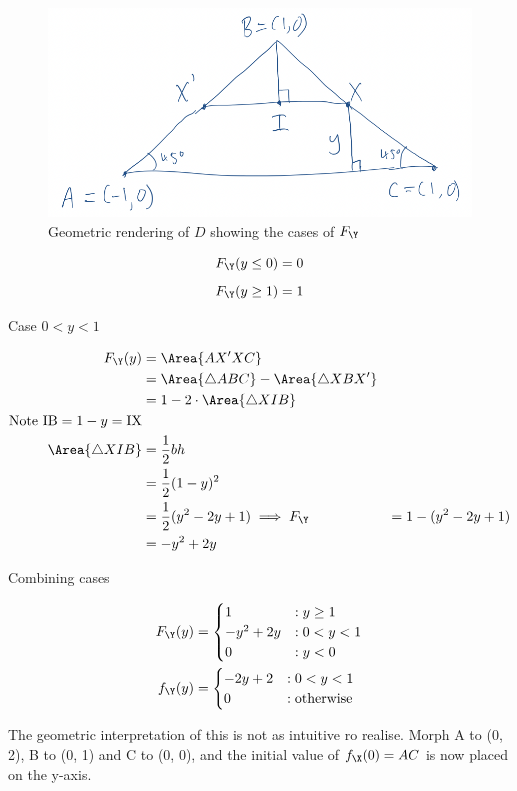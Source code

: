 \begin{figure}[ht]
	\includegraphics[width=1 \textwidth]{Q2c Y diagram.png}
	\caption{Geometric rendering of $D$ showing the cases of $F_\Y$}
	\label{fig:q2c-y}
\end{figure}

\[
F_\Y(y \leq 0) = 0
\]
\[
F_\Y(y \geq 1) = 1
\]

Case $0 < y < 1$

\begin{align*}
F_\Y(y) &= \Area{AX'XC} \\
&= \Area{\triangle ABC} - \Area{\triangle XBX'} \\
&= 1 - 2 \cdot \Area{\triangle XIB} \\
\text{Note } \mathrm{IB} = 1 - y = \mathrm{IX} \\
\Area{\triangle XIB} &= \frac{1}{2}bh \\
&= \frac{1}{2}(1 - y)^2 \\
&= \frac{1}{2}(y^2 - 2y + 1)
\implies F_\Y &= 1 - (y^2 - 2y + 1) \\
&= -y^2 + 2y
\end{align*}

Combining cases

\begin{align*}
F_\Y(y) &= \begin{cases}
1 &: y \geq 1 \\
-y^2 +2y &: 0 < y < 1 \\
0 &: y < 0 \\
\end{cases} \\
f_\Y(y) &= \begin{cases}
-2y + 2 &: 0 < y < 1 \\
0 &: \text{otherwise}
\end{cases}
\end{align*}

The geometric interpretation of this is not as intuitive ro realise.
Morph A to (0, 2), B to (0, 1) and C to (0, 0), and the initial
value of $f_\X(0) = AC$ is now placed on the y-axis.

